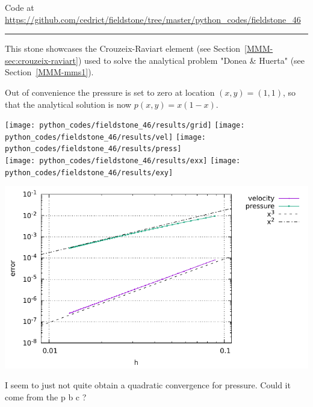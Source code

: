 

\begin{center}
Code at \url{https://github.com/cedrict/fieldstone/tree/master/python_codes/fieldstone_46}
\end{center}

\par\noindent\rule{\textwidth}{0.4pt}

This stone showcases the Crouzeix-Raviart element (see Section~\ref{MMM-sec:crouzeix-raviart})
used to solve the analytical problem "Donea \& Huerta" (see Section~\ref{MMM-mms1}).

Out of convenience the pressure is set to zero at location $(x,y)=(1,1)$, so that the 
analytical solution is now $p(x,y)=x(1-x)$. 

\begin{center}
\texttt{[image: python\_codes/fieldstone\_46/results/grid]}
\texttt{[image: python\_codes/fieldstone\_46/results/vel]}
\texttt{[image: python\_codes/fieldstone\_46/results/press]}\\
\texttt{[image: python\_codes/fieldstone\_46/results/exx]}
\texttt{[image: python\_codes/fieldstone\_46/results/exy]}
\end{center}

\begin{center}
\includegraphics[width=14cm]{python_codes/fieldstone_46/results/errors.pdf}
\end{center}

I seem to just not quite obtain a quadratic convergence for pressure. Could it come 
from the p b c ?
